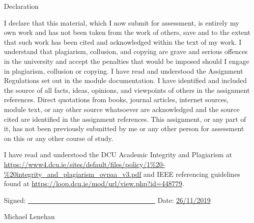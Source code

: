\thispagestyle{plain}
\begingroup
\renewcommand{\cleardoublepage}{}
\renewcommand{\clearpage}{}

\LARGE{Declaration}

\endgroup

\vskip 1cm

I declare that this material, which I now submit for assessment, is entirely my
own work and has not been taken from the work of others, save and to the extent
that such work has been cited and acknowledged within the text of my work. I
understand that plagiarism, collusion, and copying are grave and serious
offences in the university and accept the penalties that would be imposed should
I engage in plagiarism, collusion or copying. I have read and understood the
Assignment Regulations set out in the module documentation. I have identified
and included the source of all facts, ideas, opinions, and viewpoints of others
in the assignment references. Direct quotations from books, journal articles,
internet sources, module text, or any other source whatsoever are acknowledged
and the source cited are identified in the assignment references. This
assignment, or any part of it, has not been previously submitted by me or any
other person for assessment on this or any other course of study.

I have read and understood the DCU Academic Integrity and Plagiarism at
\url{https://www4.dcu.ie/sites/default/files/policy/1%20-%20integrity_and_plagiarism\_ovpaa_v3.pdf}
and IEEE referencing guidelines found at
\url{https://loop.dcu.ie/mod/url/view.php?id=448779}.

\vskip 1cm
Signed: \underline{\ \ \ \ \ \ \ \ \ \ \ \ \ \ \ \ \ \ \ \ \ \ \ \ \ \ \ \ \ \ \
\ \ \ \ \ \ } \hspace{20mm}Date: \underline{26/11/2019}

\hspace*{0mm}\phantom{Signed:}Michael Lenehan

\pagebreak
